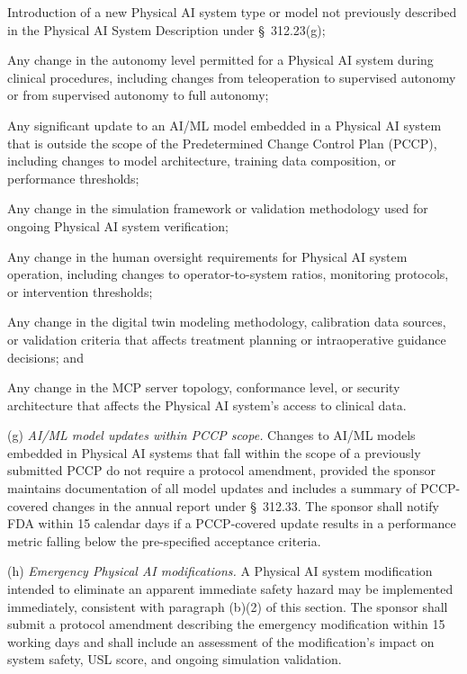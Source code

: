 \documentclass[11pt]{article}
\begin{document}
\begin{description}[leftmargin=0.8cm,style=sameline]
\item[(i)] Introduction of a new Physical AI system type or model not previously described in the Physical AI System Description under \S~312.23(g);
\item[(ii)] Any change in the autonomy level permitted for a Physical AI system during clinical procedures, including changes from teleoperation to supervised autonomy or from supervised autonomy to full autonomy;
\item[(iii)] Any significant update to an AI/ML model embedded in a Physical AI system that is outside the scope of the Predetermined Change Control Plan (PCCP), including changes to model architecture, training data composition, or performance thresholds;
\item[(iv)] Any change in the simulation framework or validation methodology used for ongoing Physical AI system verification;
\item[(v)] Any change in the human oversight requirements for Physical AI system operation, including changes to operator-to-system ratios, monitoring protocols, or intervention thresholds;
\item[(vi)] Any change in the digital twin modeling methodology, calibration data sources, or validation criteria that affects treatment planning or intraoperative guidance decisions; and
\item[(vii)] Any change in the MCP server topology, conformance level, or security architecture that affects the Physical AI system's access to clinical data.
\end{description}

(g) \textit{AI/ML model updates within PCCP scope.} Changes to AI/ML models embedded in Physical AI systems that fall within the scope of a previously submitted PCCP do not require a protocol amendment, provided the sponsor maintains documentation of all model updates and includes a summary of PCCP-covered changes in the annual report under \S~312.33. The sponsor shall notify FDA within 15 calendar days if a PCCP-covered update results in a performance metric falling below the pre-specified acceptance criteria.

(h) \textit{Emergency Physical AI modifications.} A Physical AI system modification intended to eliminate an apparent immediate safety hazard may be implemented immediately, consistent with paragraph (b)(2) of this section. The sponsor shall submit a protocol amendment describing the emergency modification within 15 working days and shall include an assessment of the modification's impact on system safety, USL score, and ongoing simulation validation.
\end{document}
